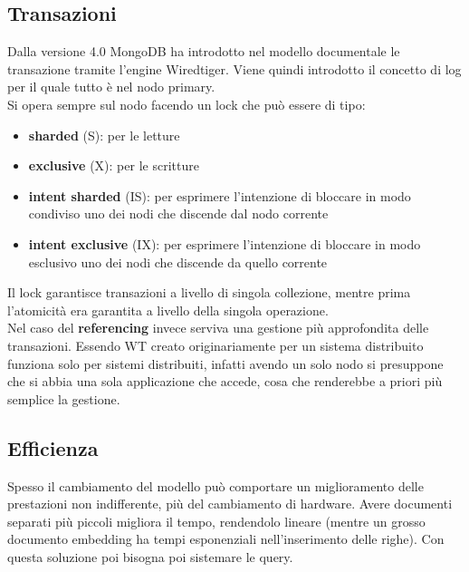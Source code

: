 \subsection{Transazioni}
Dalla versione 4.0 MongoDB ha introdotto nel modello documentale le transazione tramite l’engine Wiredtiger. Viene quindi introdotto il concetto di log per il quale tutto è nel nodo primary. \\
Si opera sempre sul nodo facendo un lock che può essere di tipo:
\begin{itemize}
    \item \textbf{sharded} (S): per le letture
    \item \textbf{exclusive} (X): per le scritture
    \item \textbf{intent sharded} (IS): per esprimere l’intenzione di bloccare in modo condiviso uno dei nodi che discende dal nodo corrente
    \item \textbf{intent exclusive} (IX): per esprimere l’intenzione di bloccare in modo esclusivo uno dei nodi che discende da quello corrente 
    \end{itemize}
Il lock garantisce transazioni a livello di singola collezione, mentre prima l’atomicità era garantita a livello della singola operazione. \\
Nel caso del \textbf{referencing} invece serviva una gestione più approfondita delle transazioni. Essendo WT creato originariamente per un sistema distribuito funziona solo per sistemi distribuiti, infatti avendo un solo nodo si presuppone che si abbia una sola applicazione che accede, cosa che renderebbe a priori più semplice la gestione.

\subsection{Efficienza}
Spesso il cambiamento del modello può comportare un miglioramento delle prestazioni non indifferente, più del cambiamento di hardware. Avere documenti separati più piccoli migliora il tempo, rendendolo lineare (mentre un grosso documento embedding ha tempi esponenziali nell’inserimento delle righe).
Con questa soluzione poi bisogna poi sistemare le query.